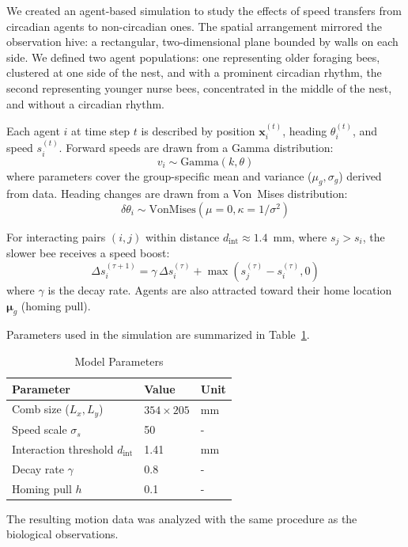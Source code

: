 \documentclass{article}
\newcommand{\added}[1]{{\color{blue}#1}}
\newcommand{\added}[1]{#1}
\begin{document}
\added{We created an agent-based simulation to study the effects of speed transfers from circadian agents to non-circadian ones. The spatial arrangement mirrored the observation hive: a rectangular, two-dimensional plane bounded by walls on each side. We defined two agent populations: one representing older foraging bees, clustered at one side of the nest, and with a prominent circadian rhythm, the second representing younger nurse bees, concentrated in the middle of the nest, and without a circadian rhythm.

Each agent $i$ at time step $t$ is described by position $\mathbf{x}_i^{(t)}$, heading $\theta_i^{(t)}$, and speed $s_i^{(t)}$.
Forward speeds are drawn from a Gamma distribution:
\begin{equation}
  v_i \sim \mathrm{Gamma}(k, \theta)
\end{equation}
where parameters cover the group-specific mean and variance ($\mu_g, \sigma_g$) derived from data.
Heading changes are drawn from a Von~Mises distribution:
\begin{equation}
  \delta\theta_i \sim \mathrm{VonMises}(\mu = 0, \kappa = 1/\sigma^2)
\end{equation}

For interacting pairs $(i, j)$ within distance $d_{\mathrm{int}} \approx 1.4$~mm, where $s_j > s_i$, the slower bee receives a speed boost:
\begin{equation}
  \Delta s_i^{(\tau+1)} = \gamma \, \Delta s_i^{(\tau)} + \max(s_j^{(\tau)} - s_i^{(\tau)}, 0)
\end{equation}
where $\gamma$ is the decay rate.
Agents are also attracted toward their home location $\mathbf{\mu}_g$ (homing pull).

Parameters used in the simulation are summarized in Table~\ref{tab:params}.

\begin{table}[h]
\centering
\caption{\added{Model Parameters}}
\label{tab:params}
\begin{tabular}{lll}
\hline
Parameter & Value & Unit \\
\hline
Comb size ($L_x, L_y$) & $354 \times 205$ & mm \\
Speed scale $\sigma_s$ & 50 & - \\
Interaction threshold $d_{\mathrm{int}}$ & 1.41 & mm \\
Decay rate $\gamma$ & 0.8 & - \\
Homing pull $h$ & 0.1 & - \\
\hline
\end{tabular}
\end{table}

The resulting motion data was analyzed with the same procedure as the biological observations.}
\end{document}
